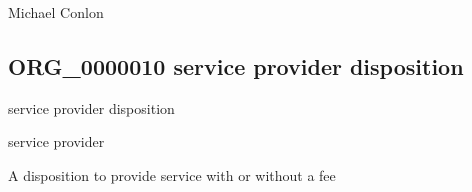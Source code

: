 \documentclass[letterpaper,10pt,english]{sphinxmanual}
\begin{document}
\begin{sphinxShadowBox}

\sphinxAtStartPar
{}
\end{sphinxShadowBox}

\begin{sphinxShadowBox}

\sphinxAtStartPar
Michael Conlon 
\end{sphinxShadowBox}
\begin{quote}

\ignorespaces \end{quote}


\subsection{ORG\_0000010 \sphinxhyphen{} service provider disposition}
\label{\detokenize{doc-ORG_0000010:org-0000010-service-provider-disposition}}\label{\detokenize{doc-ORG_0000010:index-0}}\label{\detokenize{doc-ORG_0000010::doc}}
\begin{sphinxShadowBox}

\sphinxAtStartPar
service provider disposition
\end{sphinxShadowBox}

\begin{sphinxShadowBox}

\sphinxAtStartPar
service provider
\end{sphinxShadowBox}

\begin{sphinxShadowBox}

\sphinxAtStartPar
{\hyperref[\detokenize{doc-BFO_0000016::doc}]{}}
\end{sphinxShadowBox}

\begin{sphinxShadowBox}

\sphinxAtStartPar
A disposition to provide service with or without a fee
\end{sphinxShadowBox}
\end{document}
